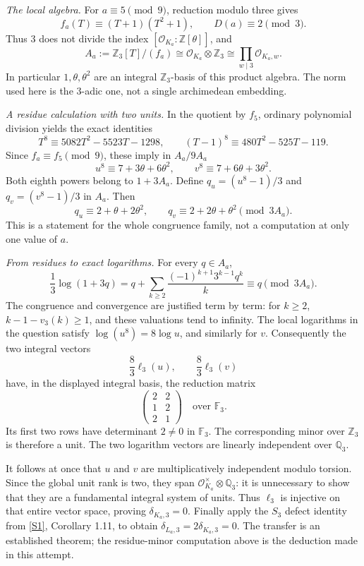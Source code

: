 \documentclass[11pt,a4paper]{article}
\newcommand{\Z}{\mathbb{Z}}
\newcommand{\Q}{\mathbb{Q}}
\newcommand{\F}{\mathbb{F}}
\newcommand{\sref}[2]{\hyperlink{source:#1:#2}{[S#2]}}
\numberwithin{equation}{section}
\begin{document}
\textit{The local algebra.} For $a\equiv5\pmod9$, reduction modulo three
gives
\[
 f_a(T)\equiv(T+1)(T^2+1),\qquad D(a)\equiv2\pmod3.
\]
Thus $3$ does not divide the index $[\mathcal O_{K_a}:\Z[\theta]]$, and
\[
 A_a:=\Z_3[T]/(f_a)\cong\mathcal O_{K_a}\otimes\Z_3
          \cong\prod_{w\mid3}\mathcal O_{K_a,w}.
\]
In particular $1,\theta,\theta^2$ are an integral $\Z_3$-basis of this
product algebra. The norm used here is the $3$-adic one, not a single
archimedean embedding.

\textit{A residue calculation with two units.} In the quotient by $f_5$,
ordinary polynomial division yields the exact identities
\[
 T^8\equiv5082T^2-5523T-1298,\qquad
 (T-1)^8\equiv480T^2-525T-119.
\]
Since $f_a\equiv f_5\pmod9$, these imply in $A_a/9A_a$
\[
 u^8\equiv7+3\theta+6\theta^2,
 \qquad v^8\equiv7+6\theta+3\theta^2.
\]
Both eighth powers belong to $1+3A_a$. Define
$q_u=(u^8-1)/3$ and $q_v=(v^8-1)/3$ in $A_a$. Then
\begin{equation}\label{eq156-residues}
 q_u\equiv2+\theta+2\theta^2,\qquad
 q_v\equiv2+2\theta+\theta^2\pmod{3A_a}.
\end{equation}
This is a statement for the whole congruence family, not a computation at
only one value of $a$.

\textit{From residues to exact logarithms.} For every $q\in A_a$,
\[
 \frac13\log(1+3q)
 =q+\sum_{k\ge2}\frac{(-1)^{k+1}3^{k-1}q^k}{k}
 \equiv q\pmod{3A_a}.
\]
The congruence and convergence are justified term by term: for $k\ge2$,
$k-1-v_3(k)\ge1$, and these valuations tend to infinity. The local
logarithms in the question satisfy $\log(u^8)=8\log u$, and similarly for
$v$. Consequently the two integral vectors
\[
 \frac83\ell_3(u),\qquad\frac83\ell_3(v)
\]
have, in the displayed integral basis, the reduction matrix
\begin{equation}\label{eq156-minor}
 \begin{pmatrix}2&2\\1&2\\2&1\end{pmatrix}\quad\text{over }\F_3.
\end{equation}
Its first two rows have determinant $2\ne0$ in $\F_3$. The corresponding
minor over $\Z_3$ is therefore a unit. The two logarithm vectors are
linearly independent over $\Q_3$.

It follows at once that $u$ and $v$ are multiplicatively independent modulo
torsion. Since the global unit rank is two, they span
$\mathcal O_{K_a}^{\times}\otimes\Q_3$: it is unnecessary to show that they
are a fundamental integral system of units. Thus $\ell_3$ is injective on
that entire vector space, proving $\delta_{K_a,3}=0$. Finally apply the
$S_3$ defect identity from \sref{1273}{1}, Corollary 1.11, to obtain
$\delta_{L_a,3}=2\delta_{K_a,3}=0$. The transfer is an established theorem;
the residue-minor computation above is the deduction made in this attempt.
\end{document}

